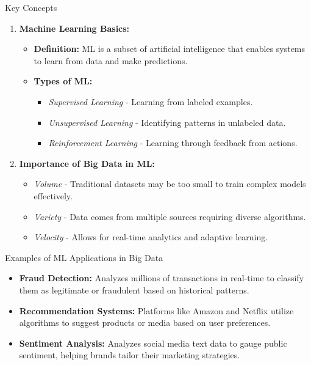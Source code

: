 \documentclass[aspectratio=169]{beamer}
\begin{document}
\begin{frame}{Key Concepts}
    \begin{enumerate}
        \item \textbf{Machine Learning Basics:}
            \begin{itemize}
                \item \textbf{Definition:} ML is a subset of artificial intelligence that enables systems to learn from data and make predictions.
                \item \textbf{Types of ML:}
                    \begin{itemize} 
                        \item \textit{Supervised Learning} - Learning from labeled examples.
                        \item \textit{Unsupervised Learning} - Identifying patterns in unlabeled data.
                        \item \textit{Reinforcement Learning} - Learning through feedback from actions.
                    \end{itemize}
            \end{itemize}
        
        \item \textbf{Importance of Big Data in ML:}
            \begin{itemize}
                \item \textit{Volume} - Traditional datasets may be too small to train complex models effectively.
                \item \textit{Variety} - Data comes from multiple sources requiring diverse algorithms.
                \item \textit{Velocity} - Allows for real-time analytics and adaptive learning.
            \end{itemize}
    \end{enumerate}
\end{frame}

\begin{frame}[fragile]{Examples of ML Applications in Big Data}
    \begin{itemize}
        \item \textbf{Fraud Detection:} Analyzes millions of transactions in real-time to classify them as legitimate or fraudulent based on historical patterns.
        \item \textbf{Recommendation Systems:} Platforms like Amazon and Netflix utilize algorithms to suggest products or media based on user preferences.
        \item \textbf{Sentiment Analysis:} Analyzes social media text data to gauge public sentiment, helping brands tailor their marketing strategies.
    \end{itemize}
\end{frame}
\end{document}
